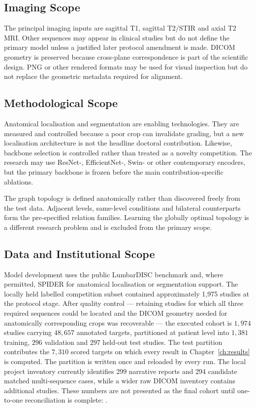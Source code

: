 \subsection{Imaging Scope}
\label{sec:intro-scope-imaging}

The principal imaging inputs are sagittal T1, sagittal T2/STIR and axial T2 MRI.
Other sequences may appear in clinical studies but do not define the primary model
unless a justified later protocol amendment is made. DICOM geometry is preserved
because cross-plane correspondence is part of the scientific design. PNG or other
rendered formats may be used for visual inspection but do not replace the geometric
metadata required for alignment.

\subsection{Methodological Scope}
\label{sec:intro-scope-method}

Anatomical localisation and segmentation are enabling technologies. They are
measured and controlled because a poor crop can invalidate grading, but a new
localisation architecture is not the headline doctoral contribution. Likewise,
backbone selection is controlled rather than treated as a novelty competition. The
research may use ResNet-, EfficientNet-, Swin- or other contemporary encoders, but
the primary backbone is frozen before the main contribution-specific ablations.

The graph topology is defined anatomically rather than discovered freely from the
test data. Adjacent levels, same-level conditions and bilateral counterparts form the
pre-specified relation families. Learning the globally optimal topology is a
different research problem and is excluded from the primary scope.

\subsection{Data and Institutional Scope}
\label{sec:intro-scope-data}

Model development uses the public LumbarDISC benchmark and, where permitted, SPIDER
for anatomical localisation or segmentation support. The locally held labelled
competition subset contained approximately 1,975 studies at the protocol stage.
After quality control --- retaining studies for which all three required
sequences could be located and the DICOM geometry needed for anatomically
corresponding crops was recoverable --- the executed cohort is $1{,}974$ studies
carrying $48{,}657$ annotated targets, partitioned at patient level into
$1{,}381$ training, $296$ validation and $297$ held-out test studies. The test
partition contributes the $7{,}310$ scored targets on which every result in
Chapter~\ref{ch:results} is computed. The partition is written once and reloaded
by every run. The local project inventory currently identifies 299 narrative reports
and 294 candidate matched multi-sequence cases, while a wider raw DICOM inventory
contains additional studies. These numbers are not presented as the final cohort
until one-to-one reconciliation is complete:
.

